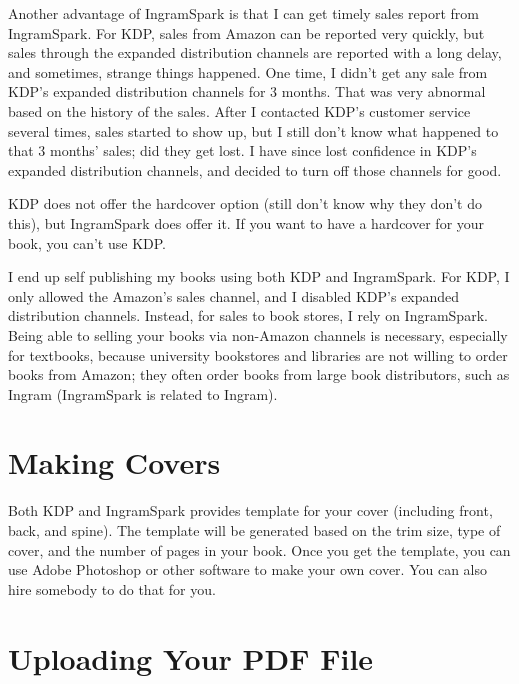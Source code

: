 Another advantage of IngramSpark is that I can get timely sales report from IngramSpark. For 
KDP, sales from Amazon can be reported very quickly, but sales through the expanded
distribution channels are reported with a long delay, and sometimes, strange things happened. 
One time, I didn't get any sale from
KDP's expanded distribution channels for 3 months. That was very abnormal based on the history
of the sales. After I contacted
KDP's customer service several times, sales started to show up, but I still don't know what happened to that
3 months' sales; did they get lost. I have since lost confidence in KDP's expanded distribution
channels, and decided to turn off those channels for good.


KDP does not offer the hardcover option (still don't know why they don't do this), but
IngramSpark does offer it. If you want to have a hardcover for your book, you can't use KDP.


I end up self publishing my books using both KDP and IngramSpark. For KDP, I only allowed the
Amazon's sales channel, and I disabled KDP's expanded distribution channels. 
Instead, for sales to book stores, I rely on IngramSpark. 
Being able to selling your books via non-Amazon channels is necessary, 
especially for textbooks, because 
university bookstores and libraries are not willing to order books from Amazon; 
they often order books from large book distributors, such as Ingram (IngramSpark is
related to Ingram). 





\section{Making Covers} 

Both KDP and IngramSpark provides template for your cover (including front, back, and spine). 
The template will be generated based on the trim size, type of cover, and the number of pages
in your book. Once you get the template, you can use Adobe Photoshop or other software to
make your own cover. You can also hire somebody to do that for you. 



\section{Uploading Your PDF File}


